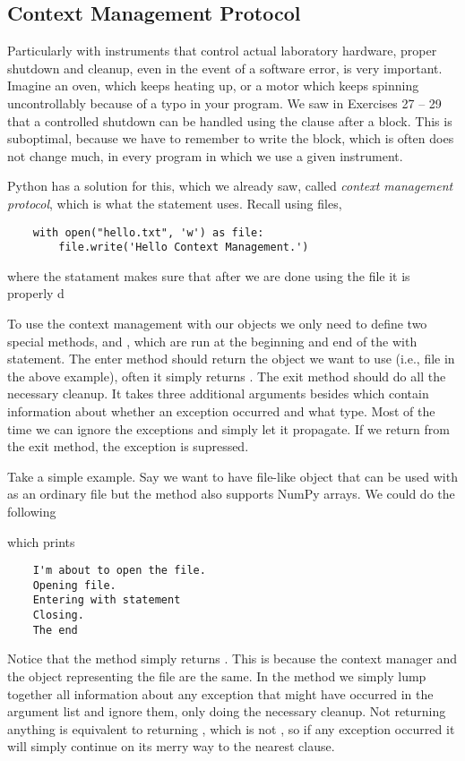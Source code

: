 \subsection{Context Management Protocol}
Particularly with instruments that control actual laboratory hardware, proper shutdown and cleanup, even in the event of a software error, is very important. Imagine an oven, which keeps heating up, or a motor which keeps spinning uncontrollably because of a typo in your program. We saw in Exercises 27 -- 29 that a controlled shutdown can be handled using the  clause after a  block. This is suboptimal, because we have to remember to write the  block, which is often does not change much, in every program in which we use a given instrument.

Python has a solution for this, which we already saw, called \emph{context management protocol}, which is what the  statement uses. Recall using files,
\begin{lstlisting}
    with open("hello.txt", 'w') as file:
        file.write('Hello Context Management.')
\end{lstlisting}
where the  statament makes sure that after we are done using the file it is properly d

To use the context management with our objects we only need to define two special methods,  and , which are run at the beginning and end of the with statement. The enter method should return the object we want to use (i.e., file in the above example), often it simply returns . The exit method should do all the necessary cleanup. It takes three additional arguments besides  which contain information about whether an exception occurred and what type. Most of the time we can ignore the exceptions and simply let it propagate. If we return  from the exit method, the exception is supressed.

Take a simple example. Say we want to have file-like object that can be used with  as an ordinary file but the method  also supports NumPy arrays. We could do the following

which prints
\begin{verbatim}
    I'm about to open the file.
    Opening file.
    Entering with statement
    Closing.
    The end
\end{verbatim}

Notice that the method  simply returns . This is because the context manager and the object representing the file are the same. In the  method we simply lump together all information about any exception that might have occurred in the  argument list and ignore them, only doing the necessary cleanup. Not returning anything is equivalent to returning , which is not , so if any exception occurred it will simply continue on its merry way to the nearest  clause.

